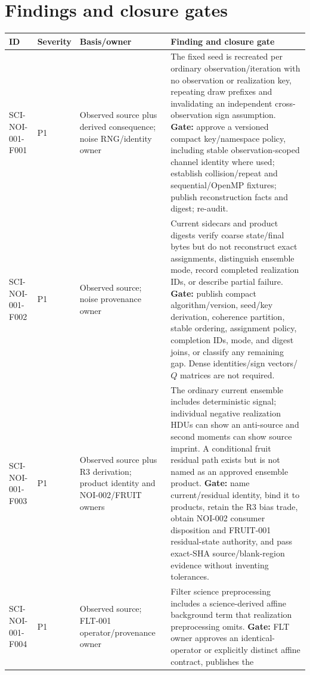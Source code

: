 \documentclass[10pt]{article}
\begin{document}
\section{Findings and closure gates}
\label{sec:findings}

\begin{longtable}{@{}p{}p{}p{}p{}@{}}
\toprule
ID & Severity & Basis/owner & Finding and closure gate \\
\midrule
\endhead
SCI-NOI-001-F001 & P1 &
Observed source plus derived consequence; noise RNG/identity owner &
The fixed seed is recreated per ordinary observation/iteration with no
observation or realization key, repeating draw prefixes and invalidating an
independent cross-observation sign assumption.  \textbf{Gate:} approve a
versioned compact key/namespace policy, including stable observation-scoped
channel identity where used; establish collision/repeat and sequential/OpenMP
fixtures; publish reconstruction facts and digest; re-audit. \\
SCI-NOI-001-F002 & P1 &
Observed source; noise provenance owner &
Current sidecars and product digests verify coarse state/final bytes but do
not reconstruct exact assignments, distinguish ensemble mode, record completed
realization IDs, or describe partial failure.  \textbf{Gate:} publish compact
algorithm/version, seed/key derivation, coherence partition, stable ordering,
assignment policy, completion IDs, mode, and digest joins, or classify any
remaining gap.  Dense identities/sign vectors/$Q$ matrices are not required. \\
SCI-NOI-001-F003 & P1 &
Observed source plus R3 derivation; product identity and NOI-002/FRUIT owners &
The ordinary current ensemble includes deterministic signal; individual
negative realization HDUs can show an anti-source and second moments can show
source imprint.  A conditional fruit residual path exists but is not named as
an approved ensemble product.  \textbf{Gate:} name current/residual identity,
bind it to products, retain the R3 bias trade, obtain NOI-002 consumer
disposition and FRUIT-001 residual-state authority, and pass exact-SHA
source/blank-region evidence without inventing tolerances. \\
SCI-NOI-001-F004 & P1 &
Observed source; FLT-001 operator/provenance owner &
Filter science preprocessing includes a science-derived affine background
term that realization preprocessing omits.  \textbf{Gate:} FLT owner approves
an identical-operator or explicitly distinct affine contract, publishes the

\end{longtable}
\end{document}
